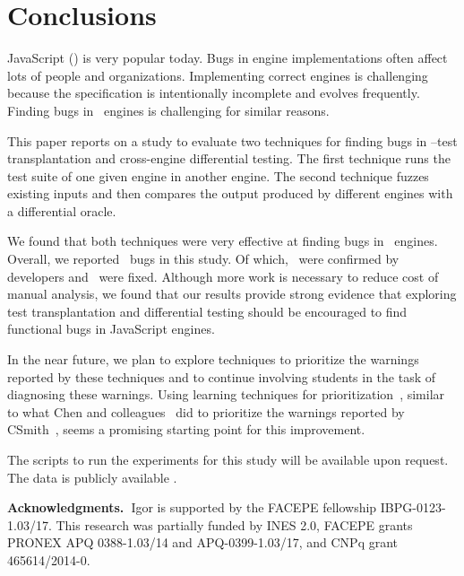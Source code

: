 \documentclass[smallextended]{svjour3}
\begin{document}
\section{Conclusions}


JavaScript (\js{}) is very popular today. Bugs in engine
implementations often affect lots of people and organizations.
Implementing correct engines is challenging because the specification
is intentionally incomplete and evolves frequently. Finding bugs in
\js\ engines is challenging for similar reasons.

This paper reports on a study to evaluate two
techniques for finding bugs in \js{}--test transplantation and
cross-engine differential testing. The first technique
runs the test suite of one given engine in another engine.
The second technique fuzzes existing inputs and then compares the
output produced by different engines with a differential oracle.

We found that both techniques were very effective at finding bugs in
\js\ engines.  Overall, we reported \totalBugsReported\ bugs in this
study. Of which, \totalBugsConfirmed\ were confirmed by developers and
\totalBugsFixed\ were fixed. Although more work is necessary to reduce
cost of manual analysis, we found that our results provide strong
evidence that exploring test transplantation and differential testing
should be encouraged to find functional bugs in JavaScript engines.

In the near future, we plan to explore techniques to prioritize the
warnings reported by these techniques and to continue involving
students in the task of diagnosing these warnings. Using learning
techniques for prioritization~\cite{icst2020violations},
similar to what Chen and colleagues~\cite{Chen:2017:LPT:3097368.3097451}
did to prioritize the warnings reported by CSmith~\cite{Yang:2011:FUB:1993498.1993532},
seems a promising starting point for this improvement.

The scripts to run the experiments for this study will be available
upon request. The data is publicly available \dataRepo{}.

\vspace{1ex}
\sloppy
\noindent\textbf{Acknowledgments.~}Igor is supported by the FACEPE
fellowship IBPG-0123-1.03/17. This research was partially funded by
INES 2.0, FACEPE grants PRONEX APQ 0388-1.03/14 and APQ-0399-1.03/17,
and CNPq grant 465614/2014-0.

\balance
%


\end{document}
